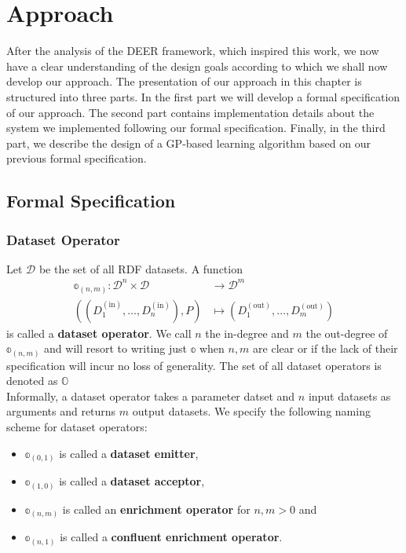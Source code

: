 \chapter{Approach}
\label{ch:approach}
After the analysis of the \ac{DEER} framework, which inspired this work, we now have a clear understanding of the design goals according to which we shall now develop our approach.
The presentation of our approach in this chapter is structured into three parts.
In the first part we will develop a formal specification of our approach.
The second part contains implementation details about the system we implemented following our formal specification.
Finally, in the third part, we describe the design of a \ac{GP}-based learning algorithm based on our previous formal specification.


\section{Formal Specification}
\label{sec:formalspec}

\subsection{Dataset Operator}

Let $\mathcal{D}$ be the set of all \ac{RDF} datasets.
A function
\begin{equation}
\begin{aligned}
\mathbb{o}_{(n,m)}\colon \mathcal{D}^n \times  \mathcal{D}  &\to \mathcal{D}^m \\
\left(\left(D_{1}^{(\text{in})}, \dots, D_{n}^{(\text{in})}\right), P\right) & \mapsto \left( D_{1}^{(\text{out})}, \dots, D_{m}^{(\text{out})} \right)
\end{aligned}
\end{equation}
is called a \textbf{dataset operator}.
We call $n$ the in-degree and $m$ the out-degree of $\mathbb{o}_{(n,m)}$ and will resort to writing just $\mathbb{o}$ when $n,m$ are clear or if the lack of their specification will incur no loss of generality. The set of all dataset operators is denoted as $\mathbb{O}$\\

Informally, a dataset operator takes a parameter datset and $n$ input datasets as arguments and returns $m$ output datasets. We specify the following naming scheme for dataset operators:
\begin{itemize}
  \item $\mathbb{o}_{(0,1)}$ is called a \textbf{dataset emitter},
  \item $\mathbb{o}_{(1,0)}$ is called a \textbf{dataset acceptor},
  \item $\mathbb{o}_{(n,m)}$ is called an \textbf{enrichment operator} for $n,m>0$ and
  \item $\mathbb{o}_{(n,1)}$ is called a \textbf{confluent enrichment operator}.
\end{itemize}

